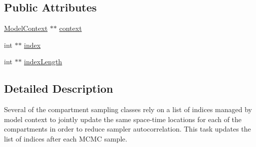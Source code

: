 \subsection*{Public Attributes}
\begin{DoxyCompactItemize}
\item 
\hyperlink{classSpatialSEIR_1_1ModelContext}{Model\-Context} $\ast$$\ast$ \hyperlink{classSpatialSEIR_1_1SetCompartmentSamplingIndicesTask_a52dd5ee41a16c253719145db4619f21d}{context}
\item 
int $\ast$$\ast$ \hyperlink{classSpatialSEIR_1_1SetCompartmentSamplingIndicesTask_aa886632dfda17a6f9a00cb1161685c35}{index}
\item 
int $\ast$$\ast$ \hyperlink{classSpatialSEIR_1_1SetCompartmentSamplingIndicesTask_ae9c42a17508247572b82dd6357ecafed}{index\-Length}
\end{DoxyCompactItemize}


\subsection{Detailed Description}
Several of the compartment sampling classes rely on a list of indices managed by model context to jointly update the same space-\/time locations for each of the compartments in order to reduce sampler autocorrelation. This task updates the list of indices after each M\-C\-M\-C sample. 

